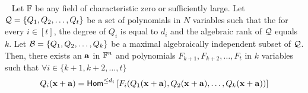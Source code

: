 \begin{lemma}~\label{lem:using algebraic dependence}
Let $\mathbb{F}$ be any  field of characteristic zero or sufficiently large. Let ${\cal Q} = \{Q_1, Q_2, \ldots, Q_t\}$ be a set of polynomials in $N$ variables such that the for every $i \in [t]$, the degree of  $Q_i$ is equal to $d_i$ and  the algebraic rank of ${\cal Q}$ equals $k$. Let  ${\cal B} = \{Q_1, Q_2, \ldots, Q_k\}$ be a maximal algebraically independent subset of ${\cal Q}$. Then, there exists an $\mathbf{a}$ in $\mathbb{F}^n$ and polynomials $F_{k+1}, F_{k+2}, \ldots, F_{t}$  in $k$ variables such that $\forall i \in \{k+1, k+2, \ldots, t\}$
$$Q_i(\mathbf{x} + \mathbf{a}) = \mathsf{Hom}^{\leq d_i}\left[F_i(Q_1(\mathbf{x} + \mathbf{a}), Q_2(\mathbf{x} + \mathbf{a}), \ldots, Q_k(\mathbf{x} + \mathbf{a})) \right] $$
\end{lemma}
